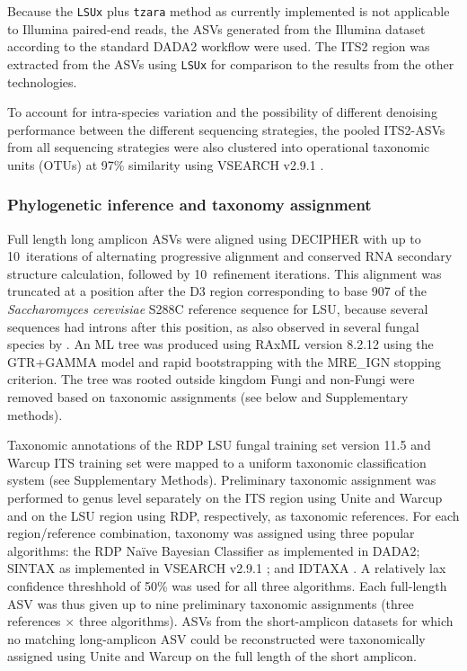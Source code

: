 \documentclass[
  12pt,
]{article}
\begin{document}
Because the \texttt{LSUx} plus \texttt{tzara} method as currently implemented is not applicable to Illumina paired-end reads, the ASVs generated from the Illumina dataset according to the standard DADA2 workflow were used.
The ITS2 region was extracted from the ASVs using \texttt{LSUx} for comparison to the results from the other technologies.

To account for intra-species variation and the possibility of different denoising performance between the different sequencing strategies, the pooled ITS2-ASVs from all sequencing strategies were also clustered into operational taxonomic units (OTUs) at 97\% similarity using VSEARCH v2.9.1 \autocite{rognes2016}.

\hypertarget{phylogenetic-inference-and-taxonomy-assignment}{%
\subsubsection{Phylogenetic inference and taxonomy assignment}\label{phylogenetic-inference-and-taxonomy-assignment}}

Full length long amplicon ASVs were aligned using DECIPHER \autocite{wright2015} with up to 10~iterations of alternating progressive alignment and conserved RNA secondary structure calculation, followed by 10~refinement iterations.
This alignment was truncated at a position after the D3 region corresponding to base 907 of the \emph{Saccharomyces cerevisiae} S288C reference sequence for LSU, because several sequences had introns after this position, as also observed in several fungal species by \textcite{holst-jensen1999}.
An ML tree was produced using RAxML version 8.2.12 \autocite{stamatakis2014} using the GTR+GAMMA model and rapid bootstrapping with the MRE\_IGN stopping criterion.
The tree was rooted outside kingdom Fungi and non-Fungi were removed based on taxonomic assignments (see below and Supplementary methods).

Taxonomic annotations of the RDP LSU fungal training set version 11.5 \autocite{cole2014} and Warcup ITS training set \autocite{deshpande2016} were mapped to a uniform taxonomic classification system (see Supplementary Methods).
Preliminary taxonomic assignment was performed to genus level separately on the ITS region using Unite and Warcup and on the LSU region using RDP, respectively, as taxonomic references.
For each region/reference combination, taxonomy was assigned using three popular algorithms:
the RDP Naïve Bayesian Classifier \autocite[RDPC,][]{wang2007} as implemented in DADA2;
SINTAX \autocite{edgar2016a} as implemented in VSEARCH v2.9.1 \autocite{rognes2016};
and IDTAXA \autocite{murali2018}.
A relatively lax confidence threshhold of 50\% was used for all three algorithms.
Each full-length ASV was thus given up to nine preliminary taxonomic assignments (three references \(\times\) three algorithms).
ASVs from the short-amplicon datasets for which no matching long-amplicon ASV could be reconstructed were taxonomically assigned using Unite and Warcup on the full length of the short amplicon.
\end{document}

